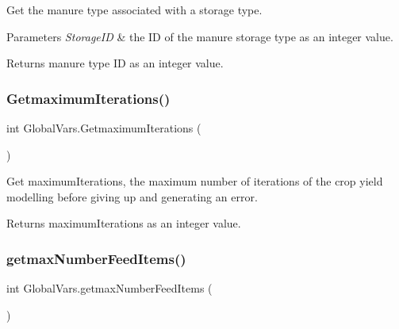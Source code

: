 Get the manure type associated with a storage type. 


\begin{DoxyParams}{Parameters}
{\em Storage\+ID} & the ID of the manure storage type as an integer value. \\
\hline
\end{DoxyParams}
\begin{DoxyReturn}{Returns}
manure type ID as an integer value. 
\end{DoxyReturn}
\mbox{\label{class_global_vars_afda3fc18e970456a249b8f14b5766f60}} 
\subsubsection{\texorpdfstring{GetmaximumIterations()}{GetmaximumIterations()}}
{\footnotesize\ttfamily int Global\+Vars.\+Getmaximum\+Iterations (\begin{DoxyParamCaption}{ }\end{DoxyParamCaption})\hspace{0.3cm}{\ttfamily [inline]}}



Get maximum\+Iterations, the maximum number of iterations of the crop yield modelling before giving up and generating an error. 

\begin{DoxyReturn}{Returns}
maximum\+Iterations as an integer value. 
\end{DoxyReturn}
\mbox{\label{class_global_vars_a76458db4b5f2b97dd8fe01f2a5a73f87}} 
\subsubsection{\texorpdfstring{getmaxNumberFeedItems()}{getmaxNumberFeedItems()}}
{\footnotesize\ttfamily int Global\+Vars.\+getmax\+Number\+Feed\+Items (\begin{DoxyParamCaption}{ }\end{DoxyParamCaption})\hspace{0.3cm}{\ttfamily [inline]}}

\mbox{\label{class_global_vars_ac5ca0cf675cbc4a5fc18f93f714b03bc}} 
